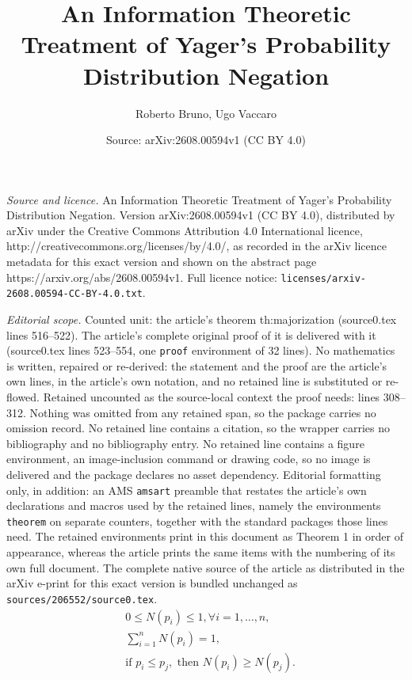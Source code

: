 \documentclass[10pt,a4paper]{amsart}
\title{An Information Theoretic Treatment of Yager's Probability Distribution Negation}
\author{Roberto Bruno, Ugo Vaccaro}
\date{Source: arXiv:2608.00594v1 (CC BY 4.0)}
\begin{document}
\maketitle

\noindent\emph{Source and licence.} An Information Theoretic Treatment of Yager's Probability Distribution Negation. Version arXiv:2608.00594v1 (CC BY 4.0), distributed by arXiv under the Creative Commons Attribution 4.0 International licence, http://creativecommons.org/licenses/by/4.0/, as recorded in the arXiv licence metadata for this exact version and shown on the abstract page https://arxiv.org/abs/2608.00594v1. Full licence notice: \texttt{licenses/arxiv-2608.00594-CC-BY-4.0.txt}.\par\smallskip

\noindent\textit{Editorial scope.} Counted unit: the article's theorem th:majorization (source0.tex lines 516--522). The article's complete original proof of it is delivered with it (source0.tex lines 523--554, one \texttt{proof} environment of 32 lines). No mathematics is written, repaired or re-derived: the statement and the proof are the article's own lines, in the article's own notation, and no retained line is substituted or re-flowed.  Retained uncounted as the source-local context the proof needs: lines 308--312.  Nothing was omitted from any retained span, so the package carries no omission record.  No retained line contains a citation, so the wrapper carries no bibliography and no bibliography entry.  No retained line contains a figure environment, an image-inclusion command or drawing code, so no image is delivered and the package declares no asset dependency.  Editorial formatting only, in addition: an AMS \texttt{amsart} preamble that restates the article's own declarations and macros used by the retained lines, namely the environments \texttt{theorem} on separate counters, together with the standard packages those lines need.  The retained environments print in this document as Theorem 1 in order of appearance, whereas the article prints the same items with the numbering of its own full document.  The complete native source of the article as distributed in the arXiv e-print for this exact version is bundled unchanged as \texttt{sources/206552/source0.tex}.
\begin{align}
    &0 \leq N(p_i) \leq 1, \forall i=1,\dots,n,\\
    &\sum_{i=1}^n N(p_i)=1,\\
    &\text{if } p_i\leq p_j, \text{ then } N(p_i) \geq N(p_j). \label{mon}
\end{align}
\end{document}
